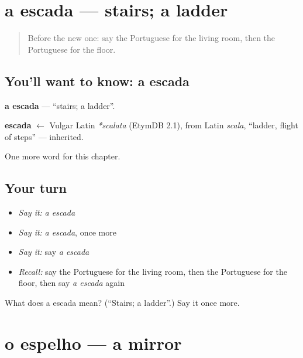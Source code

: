 \section[a escada]{a escada — stairs; a ladder}

\label{lesson:PT-C50-escada}



\begin{quote}
Before the new one: say the Portuguese for the living room, then the Portuguese for the floor.
\end{quote}

\subsection*{You'll want to know: a escada}
\textbf{a escada} — \textquotedblleft{}stairs; a ladder\textquotedblright{}.

\begin{cousinweb}
\textbf{escada} $\leftarrow$ Vulgar Latin \emph{*scalata} (EtymDB 2.1), from Latin \emph{scala}, \textquotedblleft{}ladder, flight of steps\textquotedblright{} — inherited.
\end{cousinweb}

\begin{grammarlens}[title={What you've built}]
One more word for this chapter.
\end{grammarlens}

\subsection*{Your turn}
\begin{itemize}
\raggedright
  \item \emph{Say it:} \emph{a escada}
  \item \emph{Say it:} \emph{a escada}, once more
  \item \emph{Say it:} say \emph{a escada}
  \item \emph{Recall:} say the Portuguese for the living room, then the Portuguese for the floor, then say \emph{a escada} again
\end{itemize}

\begin{tcolorbox}[breakable,colback=teal!4,colframe=teal!35!black,title={Before you move on}]
What does a escada mean? (\textquotedblleft{}Stairs; a ladder\textquotedblright{}.) Say it once more.
\end{tcolorbox}
\section[o espelho]{o espelho — a mirror}

